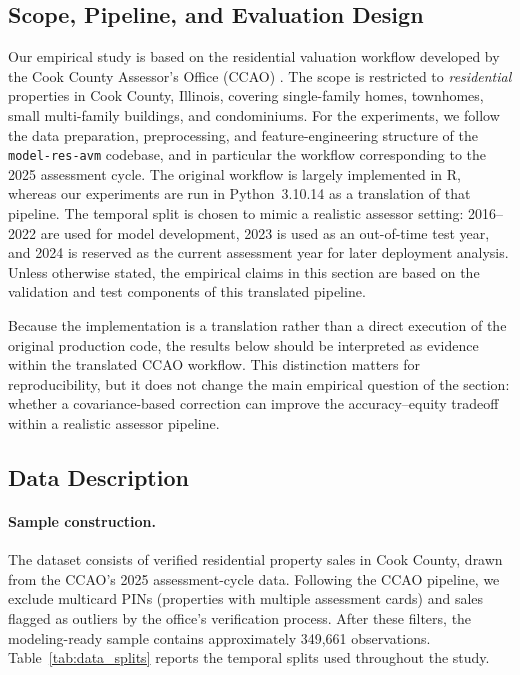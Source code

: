 \documentclass{article}
\theoremstyle{plain}
\theoremstyle{definition}
\newcommand{\1}{\mathbf{1}}
\begin{document}
\subsection{Scope, Pipeline, and Evaluation Design}

Our empirical study is based on the residential valuation workflow developed by the Cook County Assessor's Office (CCAO) \cite{ccao_data_2026}. The scope is restricted to \emph{residential} properties in Cook County, Illinois, covering single-family homes, townhomes, small multi-family buildings, and condominiums. For the experiments, we follow the data preparation, preprocessing, and feature-engineering structure of the \texttt{model-res-avm} codebase, and in particular the workflow corresponding to the 2025 assessment cycle. The original workflow is largely implemented in R, whereas our experiments are run in Python~3.10.14 as a translation of that pipeline. The temporal split is chosen to mimic a realistic assessor setting: 2016--2022 are used for model development, 2023 is used as an out-of-time test year, and 2024 is reserved as the current assessment year for later deployment analysis. Unless otherwise stated, the empirical claims in this section are based on the validation and test components of this translated pipeline.

Because the implementation is a translation rather than a direct execution of the original production code, the results below should be interpreted as evidence within the translated CCAO workflow. This distinction matters for reproducibility, but it does not change the main empirical question of the section: whether a covariance-based correction can improve the accuracy--equity tradeoff within a realistic assessor pipeline.

\subsection{Data Description}
\label{subsec:data_description}

\paragraph{Sample construction.} The dataset consists of verified residential property sales in Cook County, drawn from the CCAO's 2025 assessment-cycle data. Following the CCAO pipeline, we exclude multicard PINs (properties with multiple assessment cards) and sales flagged as outliers by the office's verification process. After these filters, the modeling-ready sample contains approximately 349{,}661 observations. Table~\ref{tab:data_splits} reports the temporal splits used throughout the study.
\end{document}
